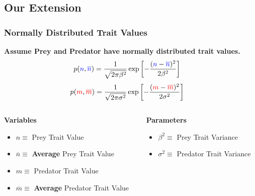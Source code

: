 \documentclass[10pt]{beamer}
\begin{document}
\subsection*{Our Extension}
\begin{frame}
	\frametitle{Normally Distributed Trait Values}
	{\bf Assume {\color{blue}Prey} and {\color{red}Predator} have normally distributed trait values.}
	\begin{align*}
		p({\color{blue}n}, {\color{blue}\overline{n}}) &= \frac{1}{\sqrt{2\pi\beta^2}}\exp\left[{-\frac{({\color{blue}n} - {\color{blue}\overline{n}})^2}{2\beta^2}}\right]
	\end{align*}
	\begin{align*}
		p({\color{red}m}, {\color{red}\overline{m}}) &= \frac{1}{\sqrt{2\pi\sigma^2}}\exp\left[{-\frac{({\color{red}m} - {\color{red}\overline{m}})^2}{2\sigma^2}}\right]
	\end{align*}
	\begin{columns}
		\begin{column}{0.50\textwidth}
			{\bf Variables}
			\begin{itemize}
				\item \footnotesize{\color{blue}$n \equiv $ Prey Trait Value}
				\item {\color{blue}$\overline{n} \equiv $ {\bf Average} Prey Trait Value}
				\item {\color{red}$m \equiv $ Predator Trait Value}
				\item {\color{red}$\overline{m} \equiv $ {\bf Average} Predator Trait Value}
			\end{itemize}
		\end{column}
		\begin{column}{0.42\textwidth}
			{\bf Parameters}
			\begin{itemize}
				\item \footnotesize$\beta^2 \equiv $ Prey Trait Variance
				\item $\sigma^2 \equiv $ Predator Trait Variance
			\end{itemize}
		\end{column}
	\end{columns}

\end{frame}
\end{document}
